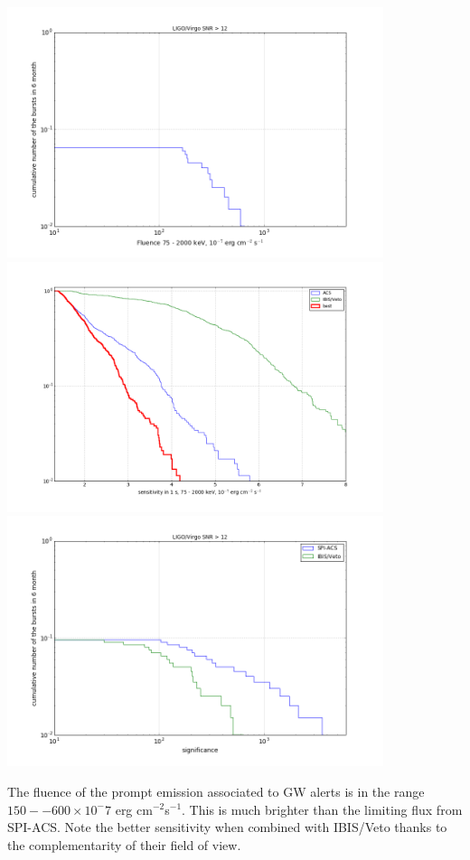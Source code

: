 \documentclass[a0,portrait]{a0poster}
\begin{document}
\begin{multicols}{2}
\begin{center}
    \includegraphics[width=11cm]{figures/fluence_distribution_12.png}
 \includegraphics[width=11cm]{figures/sensitivity_distribution.png}
    \includegraphics[width=11cm]{figures/significance_distribution_12.png}
\end{center}

The fluence of the prompt emission associated to GW alerts is in the range
$150--600 \times 10^-7$ erg cm$^{-2}$s$^{-1}$. This is much brighter than the
limiting flux from SPI-ACS. Note the better sensitivity when combined with
IBIS/Veto thanks to the complementarity of their field of view.  


\end{multicols}
\end{document}
